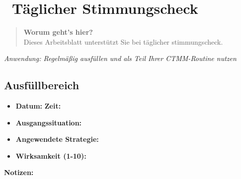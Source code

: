 
\section*{\textcolor{ctmmGreen}{\faEdit~Täglicher Stimmungscheck}}

\begin{quote}
\textbf{\textcolor{ctmmGreen}{Worum geht's hier?}}\\
Dieses Arbeitsblatt unterstützt Sie bei täglicher stimmungscheck.
\end{quote}

\textit{Anwendung: Regelmäßig ausfüllen und als Teil Ihrer CTMM-Routine nutzen}

\subsection*{\textcolor{ctmmGreen}{Ausfüllbereich}}

\begin{ctmmGreenBox}[title=Täglicher Stimmungscheck Dokumentation]
\begin{itemize}
  \item \textbf{Datum:} \underline{\hspace{3cm}} \textbf{Zeit:} \underline{\hspace{2cm}}
  \item \textbf{Ausgangssituation:} \underline{\hspace{5cm}}
  \item \textbf{Angewendete Strategie:} \underline{\hspace{5cm}}
  \item \textbf{Wirksamkeit (1-10):} \underline{\hspace{5cm}}
\end{itemize}

\vspace{0.5cm}
\textbf{Notizen:}\\
\underline{\hspace{\textwidth}}\\
\underline{\hspace{\textwidth}}\\
\underline{\hspace{\textwidth}}
\end{ctmmGreenBox}

